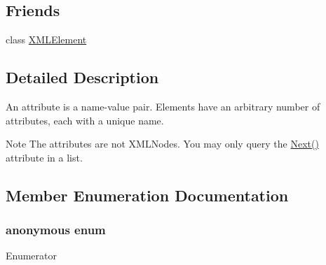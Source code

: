 \subsection*{Friends}
\begin{DoxyCompactItemize}
\item 
class \hyperlink{classtinyxml2_1_1_x_m_l_attribute_ac2fba9b6e452829dd892f7392c24e0eb}{X\-M\-L\-Element}
\end{DoxyCompactItemize}


\subsection{Detailed Description}
An attribute is a name-\/value pair. Elements have an arbitrary number of attributes, each with a unique name.

\begin{DoxyNote}{Note}
The attributes are not X\-M\-L\-Nodes. You may only query the \hyperlink{classtinyxml2_1_1_x_m_l_attribute_a7fd852d6185af90361ec1bc9a7681ad6}{Next()} attribute in a list. 
\end{DoxyNote}


\subsection{Member Enumeration Documentation}
\hypertarget{classtinyxml2_1_1_x_m_l_attribute_a1543d5687af193553e0803804c01f377}{\subsubsection[{anonymous enum}]{\setlength{\rightskip}{0pt plus 5cm}anonymous enum\hspace{0.3cm}{\ttfamily [private]}}}\label{classtinyxml2_1_1_x_m_l_attribute_a1543d5687af193553e0803804c01f377}
\begin{Desc}
\item[Enumerator]\par
\begin{description}
\item[{\em 
\hypertarget{classtinyxml2_1_1_x_m_l_attribute_a1543d5687af193553e0803804c01f377a5c77cc230dc9e6f9011ba6baa5cf6aaa}{B\-U\-F\-\_\-\-S\-I\-Z\-E}\label{classtinyxml2_1_1_x_m_l_attribute_a1543d5687af193553e0803804c01f377a5c77cc230dc9e6f9011ba6baa5cf6aaa}
}]\end{description}
\end{Desc}


